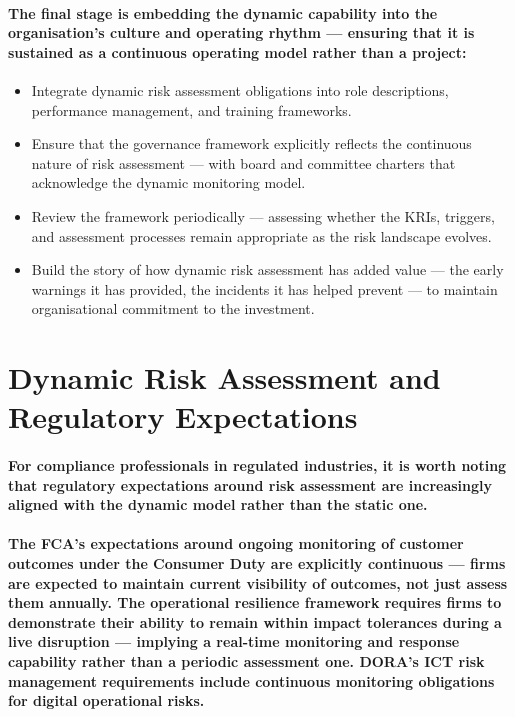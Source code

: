 \paragraph{The final stage is embedding the dynamic capability into the organisation's culture and operating rhythm — ensuring that it is sustained as a continuous operating model rather than a project:}
\begin{itemize}
  \item{Integrate dynamic risk assessment obligations into role descriptions, performance management, and training frameworks.}
  \item{Ensure that the governance framework explicitly reflects the continuous nature of risk assessment — with board and committee charters that acknowledge the dynamic monitoring model.}
  \item{Review the framework periodically — assessing whether the KRIs, triggers, and assessment processes remain appropriate as the risk landscape evolves.}
  \item{Build the story of how dynamic risk assessment has added value — the early warnings it has provided, the incidents it has helped prevent — to maintain organisational commitment to the investment.}
\end{itemize}

\section{Dynamic Risk Assessment and Regulatory Expectations}
\paragraph{For compliance professionals in regulated industries, it is worth noting that regulatory expectations around risk assessment are increasingly aligned with the dynamic model rather than the static one.}
\paragraph{The FCA's expectations around ongoing monitoring of customer outcomes under the Consumer Duty are explicitly continuous — firms are expected to maintain current visibility of outcomes, not just assess them annually. The operational resilience framework requires firms to demonstrate their ability to remain within impact tolerances during a live disruption — implying a real-time monitoring and response capability rather than a periodic assessment one. \textbf{DORA's} ICT risk management requirements include continuous monitoring obligations for digital operational risks.}
